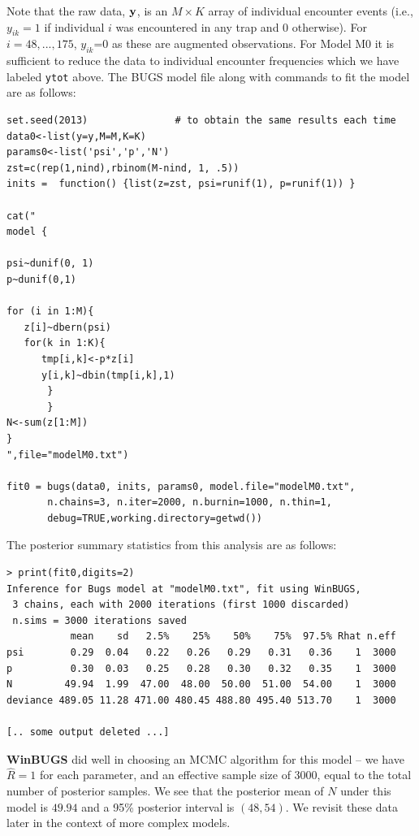 Note that the raw data, ${\bf y}$, is an $M \times K$ array of
individual encounter events (i.e., $y_{ik} = 1$ if individual $i$ was
encountered in any trap and 0 otherwise).  For $i=48,...,175$,
$y_{ik}$=0 as these are augmented observations.  For Model M0 it is
sufficient to reduce the data to individual encounter frequencies
which we have labeled \mbox{\tt ytot} above.  The BUGS model file
along with commands to fit the model are as follows:

{\small 
\begin{verbatim}
set.seed(2013)               # to obtain the same results each time
data0<-list(y=y,M=M,K=K)
params0<-list('psi','p','N')
zst=c(rep(1,nind),rbinom(M-nind, 1, .5))
inits =  function() {list(z=zst, psi=runif(1), p=runif(1)) }

cat("
model {

psi~dunif(0, 1)
p~dunif(0,1)

for (i in 1:M){
   z[i]~dbern(psi)
   for(k in 1:K){
      tmp[i,k]<-p*z[i]
      y[i,k]~dbin(tmp[i,k],1)
       }
       }
N<-sum(z[1:M])
}
",file="modelM0.txt")

fit0 = bugs(data0, inits, params0, model.file="modelM0.txt",
       n.chains=3, n.iter=2000, n.burnin=1000, n.thin=1,
       debug=TRUE,working.directory=getwd())
\end{verbatim}
}

The posterior 
 summary statistics from this analysis are as follows:
{\small
\begin{verbatim}
> print(fit0,digits=2)
Inference for Bugs model at "modelM0.txt", fit using WinBUGS,
 3 chains, each with 2000 iterations (first 1000 discarded)
 n.sims = 3000 iterations saved
           mean    sd   2.5%    25%    50%    75%  97.5% Rhat n.eff
psi        0.29  0.04   0.22   0.26   0.29   0.31   0.36    1  3000
p          0.30  0.03   0.25   0.28   0.30   0.32   0.35    1  3000
N         49.94  1.99  47.00  48.00  50.00  51.00  54.00    1  3000
deviance 489.05 11.28 471.00 480.45 488.80 495.40 513.70    1  3000

[.. some output deleted ...]
\end{verbatim}
}
{\bf WinBUGS} did well in choosing an MCMC algorithm for this model --
we have $\hat{R} = 1$ for each parameter, and an effective sample size
of 3000, equal to the total number of posterior samples. 
We see that the posterior mean of $N$ under this
model is $49.94$ and a 95\% posterior interval is $(48,54)$.  We
revisit these data later in the context of more complex models.




